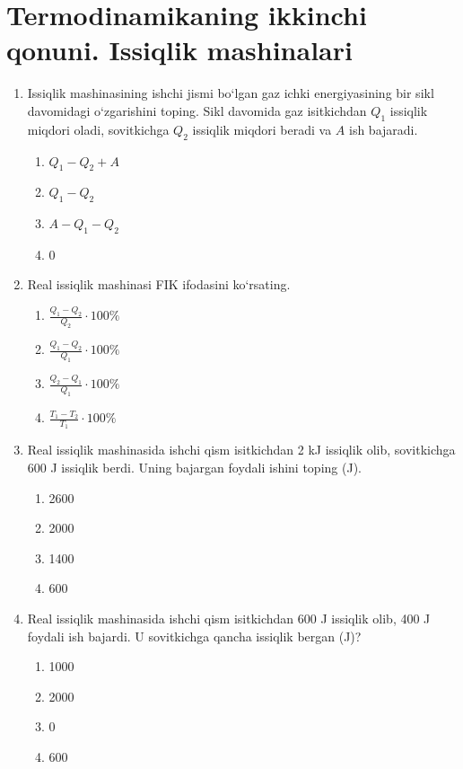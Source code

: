 \section{Termodinamikaning ikkinchi qonuni. Issiqlik mashinalari}



\begin{enumerate}

\item Issiqlik mashinasining ishchi jismi bo‘lgan gaz ichki energiyasining bir sikl davomidagi o‘zgarishini toping. Sikl davomida gaz isitkichdan $Q_1$ issiqlik miqdori oladi, sovitkichga $Q_2$ issiqlik miqdori beradi va $A$ ish bajaradi.
\begin{enumerate}[label=\Alph*)]
\item $Q_1 - Q_2 + A$
\item $Q_1 - Q_2$
\item $A - Q_1 - Q_2$
\item 0
\end{enumerate}

\item Real issiqlik mashinasi FIK ifodasini ko‘rsating.
\begin{enumerate}[label=\Alph*)]
\item $\frac{Q_1 - Q_2}{Q_2} \cdot 100\%$
\item $\frac{Q_1 - Q_2}{Q_1} \cdot 100\%$
\item $\frac{Q_2 - Q_1}{Q_1} \cdot 100\%$
\item $\frac{T_1 - T_2}{T_1} \cdot 100\%$
\end{enumerate}

\item Real issiqlik mashinasida ishchi qism isitkichdan 2 kJ issiqlik olib, sovitkichga 600 J issiqlik berdi. Uning bajargan foydali ishini toping (J).
\begin{enumerate}[label=\Alph*)]
\item 2600
\item 2000
\item 1400
\item 600
\end{enumerate}

\item Real issiqlik mashinasida ishchi qism isitkichdan 600 J issiqlik olib, 400 J foydali ish bajardi. U sovitkichga qancha issiqlik bergan (J)?
\begin{enumerate}[label=\Alph*)]
\item 1000
\item 2000
\item 0
\item 600
\end{enumerate}


\end{enumerate}
